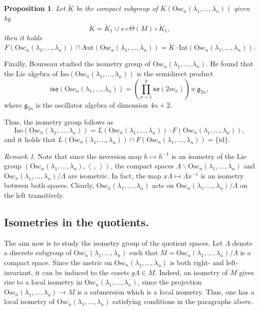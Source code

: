 \documentclass[12pt]{amsart}
\newcommand{\lela}{\left \langle}
\newcommand{\rira}{\right \rangle}
\theoremstyle{plain}
\newtheorem{prop}[thm]{Proposition}
\theoremstyle{definition}
\theoremstyle{remark}
\newtheorem{rem}{Remark}
\begin{document}
\begin{prop}
    Let \( \tilde{K} \) be the compact subgroup of \( K(\text{Osc}_n(\lambda_1, \ldots, \lambda_n)) \) given by
    \[
    \tilde{K} = \tilde{K}_1 \cup s \circ \Theta(M) \circ \tilde{K}_1,
    \]
    then it holds
    \[
    F(\text{Osc}_n(\lambda_1, \ldots, \lambda_n)) \cap \text{Aut}(\text{Osc}_n(\lambda_1, \ldots, \lambda_n)) = \tilde{K} \cdot \text{Int}(\text{Osc}_n(\lambda_1, \ldots, \lambda_n)).
    \]
\end{prop}

Finally, Bourseau studied the isometry group of \( \text{Osc}_n(\lambda_1, \ldots, \lambda_n) \). He found that the Lie algebra of \( \text{Iso}(\text{Osc}_n(\lambda_1, \ldots, \lambda_n)) \) is the semidirect product
\[
\mathfrak{iso}(\text{Osc}_n(\lambda_1, \ldots, \lambda_n)) = \left(\prod_{\nu=1}^p \mathfrak{so}(2m_{\nu})\right) \ltimes \mathfrak{g}_{2n},
\]
where \( \mathfrak{g}_{2n} \) is the oscillator algebra of dimension \( 4n+2 \).

Thus, the isometry group follows as
\[
\text{Iso}(\text{Osc}_n(\lambda_1, \ldots, \lambda_n)) = L(\text{Osc}_n(\lambda_1, \ldots, \lambda_n)) \cdot F(\text{Osc}_n(\lambda_1, \ldots, \lambda_n)),
\]
and it holds that \( L(\text{Osc}_n(\lambda_1, \ldots, \lambda_n)) \cap F(\text{Osc}_n(\lambda_1, \ldots, \lambda_n)) = \{ \text{id} \} \).



\begin{rem}
    Note that since the inversion map \( h \mapsto h^{-1} \) is an isometry of the Lie group \( (\text{Osc}_n(\lambda_1, \ldots, \lambda_n), \lela \,,\, \rira) \), the compact spaces \( \Lambda \backslash \text{Osc}_n(\lambda_1, \ldots, \lambda_n) \) and \( \text{Osc}_n(\lambda_1, \ldots, \lambda_n)/\Lambda \) are isometric. In fact, the map \( x\Lambda \mapsto \Lambda x^{-1} \) is an isometry between both spaces. Clearly, \( \text{Osc}_n(\lambda_1, \ldots, \lambda_n) \) acts on \( \text{Osc}_n(\lambda_1, \ldots, \lambda_n)/\Lambda \) on the left transitively.
\end{rem}

\subsection{Isometries in the quotients.}

The aim now is to study the isometry group of the quotient spaces. Let \( \Lambda \) denote a discrete subgroup of \( \text{Osc}_n(\lambda_1, \ldots, \lambda_n) \) such that \( M = \text{Osc}_n(\lambda_1, \ldots, \lambda_n)/\Lambda \) is a compact space. Since the metric on \( \text{Osc}_n(\lambda_1, \ldots, \lambda_n) \) is both right- and left-invariant, it can be induced to the cosets \( g\Lambda \in M \). Indeed, an isometry of \( M \) gives rise to a local isometry in \( \text{Osc}_n(\lambda_1, \ldots, \lambda_n) \), since the projection \( \text{Osc}_n(\lambda_1, \ldots, \lambda_n) \to M \) is a submersion which is a local isometry. Thus, one has a local isometry of \( \text{Osc}_n(\lambda_1, \ldots, \lambda_n) \) satisfying conditions in the paragraphs above.
\end{document}
